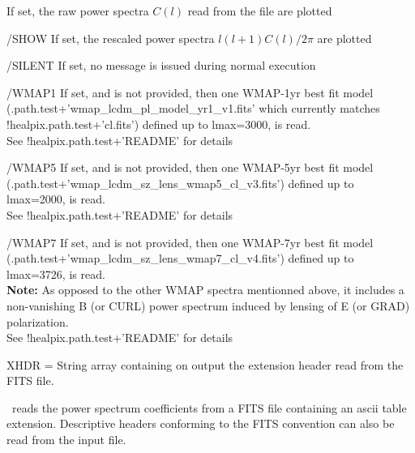 \begin{keywords}
\begin{kwlist}{}
	If set, the raw power spectra $C(l)$ read from the file are plotted
    \item[/SHOW] %
	If set, the rescaled power spectra $l(l+1)C(l)/2\pi$ are plotted
    \item[/SILENT] %
	If set, no message is issued during normal execution
%
    \item[/WMAP1] %
           If set, and  
           is not provided, then one WMAP-1yr best fit
          model
(.path.test+\-'wmap\_lcdm\_pl\_model\_yr1\_v1.fits'
which currently matches !healpix.path.test+'cl.fits') 
          defined up to lmax=3000, is read.\\
          See !healpix.path.test+'README' for details
%
    \item[/WMAP5] %
           If set, and 
           is not provided, then one WMAP-5yr best fit
          model (.path.test+\-'wmap\_lcdm\_sz\_lens\_wmap5\_cl\_v3.fits') 
          defined up to lmax=2000, is read.\\
          See !healpix.path.test+'README' for details
%
    \item[/WMAP7] %
           If set, and 
           is not provided, then one WMAP-7yr best fit
          model (.path.test+\-'wmap\_lcdm\_sz\_lens\_wmap7\_cl\_v4.fits') 
          defined up to lmax=3726, is read.\\
          {\bf Note:} As opposed to the other WMAP spectra mentionned above, it includes
             a non-vanishing B (or CURL) power spectrum 
             induced by lensing of E (or GRAD) polarization.\\
          See !healpix.path.test+'README' for details
%
    \item[XHDR =] %
	String array containing on output the extension header
      read from the FITS file. 
  \end{kwlist}
\end{keywords}  

\begin{codedescription}
{\thedocid\ reads the power spectrum coefficients from a FITS
file containing an ascii table extension. Descriptive headers conforming
to the FITS convention can also be read from the input file.
}
\end{codedescription}



